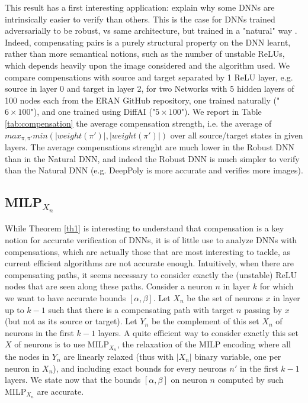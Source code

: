 \documentclass{llncs}
\begin{document}
This result has a first interesting application: explain why some DNNs are intrinsically easier to verify than others. This is the case for DNNs trained adversarially to be robust, vs same architecture, but trained in a "natural" way \cite{deeppoly,prima,crown}. Indeed, compensating pairs is a purely structural property on the DNN learnt, rather than more semantical notions, such as the number of unstable ReLUs, which depends heavily upon the image considered and the algorithm used. We compare compensations with source and target separated by 1 ReLU layer, e.g. source in layer 0 and target in layer 2, for two Networks with 5 hidden layers of 100 nodes each from the ERAN GitHub repository, one trained naturally ("$6\times100$"), 
and one trained using DiffAI ("$5\times100$"). 
We report in Table \ref{tab:compensation} the average compensation strength, i.e. 
the average of $max_{\pi,\pi'} min(|weight(\pi')|,|weight(\pi')|)$
over all source/target states in given layers. The average compensations strenght are much lower in the Robust DNN than in the Natural DNN, and indeed the Robust DNN is much simpler to verify than the Natural DNN (e.g. DeepPoly is more accurate and verifies more images).


\subsection{MILP$_{X_n}$}

While Theorem \ref{th1} is interesting to understand that compensation is a key notion for accurate verification of DNNs, it is of little use to analyze DNNs with compensations, which are actually those that are most interesting to tackle, as current efficient algorithms are not accurate enough.
Intuitively, when there are compensating paths, it seems necessary to consider exactly the (unstable) ReLU nodes that are seen along these paths. 
Consider a neuron $n$ in layer $k$ for which we want to have accurate bounds $[\alpha,\beta]$.
Let $X_n$ be the set of neurons $x$ in layer up to $k-1$ such that there is a compensating path with target $n$ passing by $x$ (but not as its source or target). Let $Y_n$ be the complement of this set $X_n$ of neurons in the first $k-1$ layers. A quite efficient way to consider exactly this set $X$ of neurons is to use MILP$_{X_n}$, the relaxation of the MILP encoding where all the nodes in $Y_n$ are linearly relaxed (thus with $|X_n|$ binary variable, one per neuron in $X_n$), and including exact bounds for every neurons $n'$ in the first $k-1$ layers. We state now that the bounds $[\alpha,\beta]$ on neuron $n$ computed by such MILP$_{X_n}$ are accurate.
\end{document}
